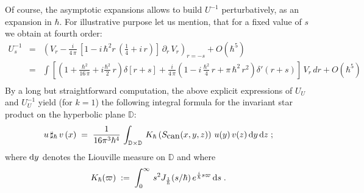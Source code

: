 \documentclass{article}
\newcommand{\DD}{\mathbb D}
\begin{document}
\noindent Of course, the asymptotic expansions allows to build $U^{-1}$ perturbatively, as an expansion in $\hbar$. For illustrative purpose let us mention, that for a fixed value of $s$ we obtain at fourth order: 
\begin{eqnarray}
U^{-1}_s&=&\left(V_r -\frac i{4\,\pi}\,\left[1- i\,\hbar^2 r\,(\frac14+ i\,r)\right]\,\partial_r\,V_r\right)_{r=-s}+ O(\hbar^5)\nonumber \\
&=&\int \left[(1+\frac {\hbar^2}{16\,\pi}+i\frac{\hbar^2}2\,r) \delta[r+s]+\frac i{4\,\pi}(1-i\,\frac{\hbar^2}4\,r+ \pi\,\hbar^2\,r^2)\delta'(r+s)\right]\,V_r\, dr + O(\hbar^5)\nonumber\\
&&
\end{eqnarray}
\noindent By a long but straightforward computation, the above explicit expressions of $U_U$ and $U_U^{-1}$ yield
(for $k=1$) the following integral formula for the invariant star product on the hyperbolic plane $\DD$:
\begin{equation*}
u\,\sharp_\hbar \,v\,(x)\;=\;\frac{1}{16 \pi^3 \hbar^4}\, \int_{\DD\times\DD}\,K_\hbar\left(S_{\mbox{\rm can}}(x,y,z)\right)\,u(y)\,v(z)\,{\rm d}y\,{\rm d}z\;;
\end{equation*}
where ${\rm d}y$ denotes the Liouville measure on $\DD$ and where 
\begin{equation}\label{noyauK}
K_\hbar (\varpi)\;:=\; \int_0^\infty \, s^2 J_{\frac{1}{\hbar}} (s/\hbar)\,
 e^{\frac{i}{\hbar} s \varpi} \,{\rm d}s\;.
\end{equation}
\end{document}
